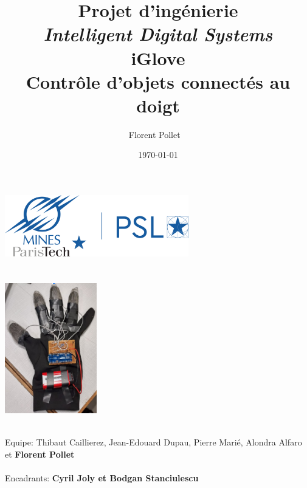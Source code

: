 \title{\Large Projet d'ingénierie\\
        \emph{Intelligent Digital Systems} \\
        \bf\Large iGlove \\
        Contrôle d’objets connectés au doigt}
\author{\large Florent Pollet \ \\}
\date{\large\today}

\makeatletter
    \begin{titlepage}
        \begin{center}
	   { \includegraphics[width=8cm]{imgs/mp_logo.png}}
	   {\ \\ \ \\}
        \vbox{}\vspace{1cm}
            {\@title }\\[0.5cm] 

            {
                \includegraphics[width=0.3\textwidth]{imgs/Gant.png}
            }

            {\large \ \\ Equipe: Thibaut Caillierez, Jean-Edouard Dupau, Pierre Marié, Alondra Alfaro et \bf Florent Pollet\ \\}
            {\large \ \\ Encadrants: \bf Cyril Joly et Bodgan Stanciulescu\ \\}
            \vspace{1cm}
            {\@date\\}
            \vspace{0.5cm}

        \end{center}




\end{titlepage}
